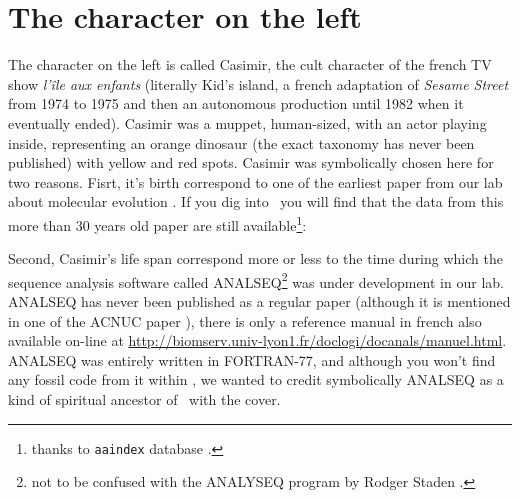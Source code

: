 \documentclass[a4paper]{article}
\begin{document}
\section*{The character on the left}

The character on the left is called Casimir, the cult character of the french
TV show \textit{l'{\^i}le aux enfants} (literally Kid's island, a french adaptation
of \textit{Sesame Street} from 1974 to 1975 and then an autonomous
production until 1982 when it eventually ended). Casimir was a muppet, 
human-sized, with an actor playing inside, representing an orange dinosaur
(the exact taxonomy has never been published) with yellow and red spots.
Casimir was symbolically chosen here for two reasons. Fisrt, it's birth 
correspond to one of the earliest paper from our lab about molecular 
evolution \cite{GranthamR1974}. If you dig into \seqinr{}~you will find
that the data from this more than 30 years old paper are still available\footnote{
thanks to \texttt{aaindex} database \cite{aaindex1,aaindex2,aaindex3}.
}:

\begin{Schunk}
\begin{Sinput}
 data(aaindex)
 grth <- which(sapply(aaindex, function(x) length(grep("Grantham", 
     x$A)) != 0))
 lapply(aaindex[grth], "[[", "D")
\end{Sinput}
\end{Schunk}

Second, Casimir's life span correspond more or less to the time during which
the sequence analysis software called ANALSEQ\footnote{
not to be confused with the ANALYSEQ program by Rodger Staden \cite{analyseq}.
} \cite{analseq} was under
development in our lab. ANALSEQ has never been published as a regular
paper (although it is mentioned in one of the ACNUC paper \cite{acnuc1984}),
there is only a reference manual in french \cite{analseq} also available on-line
at \url{http://biomserv.univ-lyon1.fr/doclogi/docanals/manuel.html}. ANALSEQ
was entirely written in FORTRAN-77, and although you won't find any fossil
code from it within \seqinr{}, we wanted to credit symbolically ANALSEQ as 
a kind of spiritual ancestor of \seqinr{}~with the cover.
\end{document}
